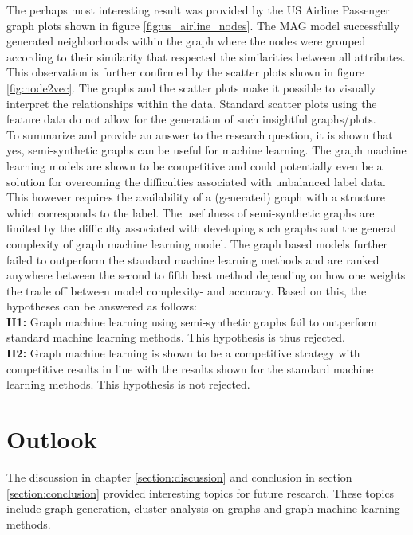   \noindent The perhaps most interesting result was provided by the US Airline
  Passenger graph plots shown in figure \ref{fig:us_airline_nodes}. The MAG 
  model successfully generated neighborhoods within the graph where the nodes 
  were grouped according to their similarity that respected the similarities
  between all attributes. This observation is further confirmed by the scatter 
  plots shown in figure \ref{fig:node2vec}. The graphs and the scatter plots
  make it possible to visually interpret the relationships within the data. 
  Standard scatter plots using the feature data do not allow for the generation 
  of such insightful graphs/plots. \\

  \noindent To summarize and provide an answer to the research question, it is
  shown that yes, semi-synthetic graphs can be useful for machine learning. The
  graph machine learning models are shown to be competitive and could
  potentially even be a solution for overcoming the difficulties associated
  with unbalanced label data. This however requires the availability of a
  (generated) graph with a structure which corresponds to the label. The 
  usefulness of semi-synthetic graphs are limited by the difficulty associated 
  with developing such graphs and the general complexity of graph machine 
  learning model. The graph based models further failed to outperform the
  standard machine learning methods and are ranked anywhere between the second
  to fifth best method depending on how one weights the trade off between model
  complexity- and accuracy. Based on this, the hypotheses can be answered as
  follows: \\

  \noindent\textbf{H1:} Graph machine learning using semi-synthetic graphs fail
  to outperform standard machine learning methods. This hypothesis is thus
  rejected. \\

  \noindent\textbf{H2:} Graph machine learning is shown to be a competitive
  strategy with competitive results in line with the results shown for the
  standard machine learning methods. This hypothesis is not rejected.

  \section{Outlook}

  The discussion in chapter \ref{section:discussion} and conclusion in section
  \ref{section:conclusion} provided interesting topics for future research.
  These topics include graph generation, cluster analysis on graphs and graph 
  machine learning methods. 


